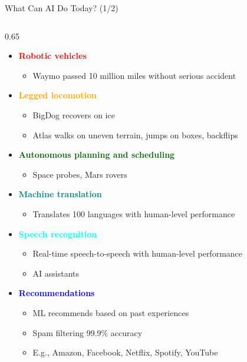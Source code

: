 \documentclass[
  10pt,
  ignorenonframetext,
]{beamer}
\providecommand{\tightlist}{%
  \setlength{\itemsep}{0pt}\setlength{\parskip}{0pt}}
\begin{document}
\begin{frame}{What Can AI Do Today? (1/2)}
\label{what-can-ai-do-today-12}
\begin{columns}[T]
\begin{column}{0.65\textwidth}
\begin{itemize}
\tightlist
\item
  \textbf{\textcolor{red}{Robotic vehicles}}

  \begin{itemize}
  \tightlist
  \item
    Waymo passed 10 million miles without serious accident
  \end{itemize}
\item
  \textbf{\textcolor{orange}{Legged locomotion}}

  \begin{itemize}
  \tightlist
  \item
    BigDog recovers on ice
  \item
    Atlas walks on uneven terrain, jumps on boxes, backflips
  \end{itemize}
\item
  \textbf{\textcolor{darkgreen}{Autonomous planning and scheduling}}

  \begin{itemize}
  \tightlist
  \item
    Space probes, Mars rovers
  \end{itemize}
\item
  \textbf{\textcolor{teal}{Machine translation}}

  \begin{itemize}
  \tightlist
  \item
    Translates 100 languages with human-level performance
  \end{itemize}
\item
  \textbf{\textcolor{cyan}{Speech recognition}}

  \begin{itemize}
  \tightlist
  \item
    Real-time speech-to-speech with human-level performance
  \item
    AI assistants
  \end{itemize}
\item
  \textbf{\textcolor{blue}{Recommendations}}

  \begin{itemize}
  \tightlist
  \item
    ML recommends based on past experiences
  \item
    Spam filtering 99.9\% accuracy
  \item
    E.g., Amazon, Facebook, Netflix, Spotify, YouTube
  \end{itemize}
\end{itemize}
\end{column}


\end{columns}
\end{frame}
\end{document}
